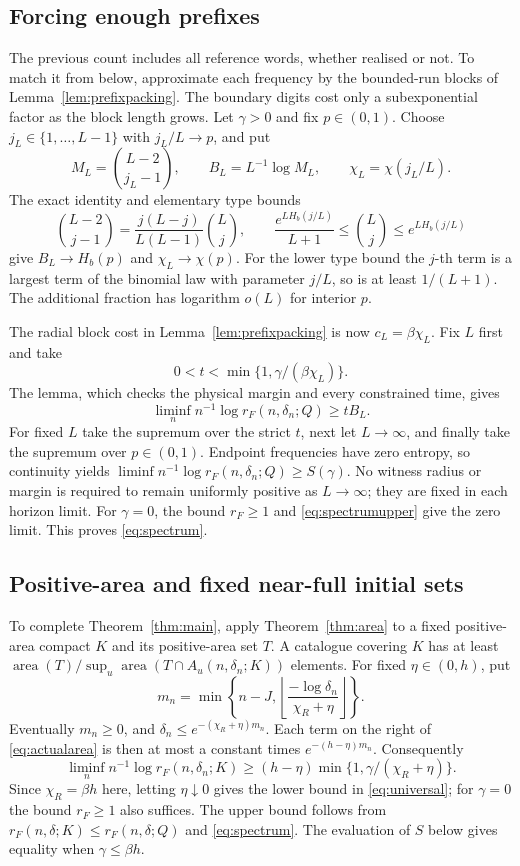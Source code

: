\documentclass[11pt]{amsart}
\theoremstyle{definition}
\theoremstyle{remark}
\newcommand{\area}{\operatorname{area}}
\numberwithin{equation}{section}
\begin{document}
\subsection{Forcing enough prefixes}
The previous count includes all reference words, whether realised
or not. To match it from below, approximate each frequency by the
bounded-run blocks of Lemma~\ref{lem:prefixpacking}. The boundary
digits cost only a subexponential factor as the block length grows.
Let $\gamma>0$ and fix $p\in(0,1)$.
Choose $j_L\in\{1,\ldots,L-1\}$ with $j_L/L\to p$, and put
\[
M_L=\binom{L-2}{j_L-1},\qquad
B_L=L^{-1}\log M_L,\qquad \chi_L=\chi(j_L/L).
\]
The exact identity and elementary type bounds
\[
\binom{L-2}{j-1}=\frac{j(L-j)}{L(L-1)}\binom Lj,\qquad
\frac{e^{LH_b(j/L)}}{L+1}\le\binom Lj\le e^{LH_b(j/L)}
\]
give $B_L\to H_b(p)$ and $\chi_L\to\chi(p)$.
For the lower type bound the $j$-th term is a largest term of
the binomial law with parameter $j/L$, so is at least $1/(L+1)$.
The additional fraction has logarithm $o(L)$ for interior $p$.

The radial block cost in Lemma~\ref{lem:prefixpacking} is now
$c_L=\beta\chi_L$. Fix $L$ first and take
\begin{equation}\label{eq:prefixratio}
0<t<\min\{1,\gamma/(\beta\chi_L)\}.
\end{equation}
The lemma, which checks the physical margin and every constrained
time, gives
\begin{equation}\label{eq:prefixlower}
\liminf_n n^{-1}\log r_F(n,\delta_n;Q)\ge tB_L.
\end{equation}
For fixed $L$ take the supremum over the strict $t$, next let
$L\to\infty$, and finally take the supremum over $p\in(0,1)$.
Endpoint frequencies have zero entropy, so continuity yields
$\liminf n^{-1}\log r_F(n,\delta_n;Q)\ge S(\gamma)$.
No witness radius or margin is required to remain uniformly positive
as $L\to\infty$; they are fixed in each horizon limit.
For $\gamma=0$, the bound $r_F\ge1$ and
\eqref{eq:spectrumupper} give the zero limit.
This proves \eqref{eq:spectrum}.

\subsection{Positive-area and fixed near-full initial sets}
To complete Theorem~\ref{thm:main}, apply Theorem~\ref{thm:area}
to a fixed positive-area compact $K$ and its positive-area set $T$.
A catalogue covering $K$ has at least
$\area(T)/\sup_u\area(T\cap A_u(n,\delta_n;K))$ elements.
For fixed $\eta\in(0,h)$, put
\[
m_n=\min\left\{n-J,
 \left\lfloor\frac{-\log\delta_n}{\chi_R+\eta}\right\rfloor\right\}.
\]
Eventually $m_n\ge0$, and
$\delta_n\le e^{-(\chi_R+\eta)m_n}$.
Each term on the right of \eqref{eq:actualarea} is then at most
a constant times $e^{-(h-\eta)m_n}$. Consequently
\[
\liminf_n n^{-1}\log r_F(n,\delta_n;K)
 \ge (h-\eta)\min\{1,\gamma/(\chi_R+\eta)\}.
\]
Since $\chi_R=\beta h$ here, letting $\eta\downarrow0$
gives the lower bound in
\eqref{eq:universal}; for $\gamma=0$ the bound $r_F\ge1$
also suffices. The upper bound follows from
$r_F(n,\delta;K)\le r_F(n,\delta;Q)$ and
\eqref{eq:spectrum}. The evaluation of $S$ below gives equality when $\gamma\le\beta h$.
\end{document}

